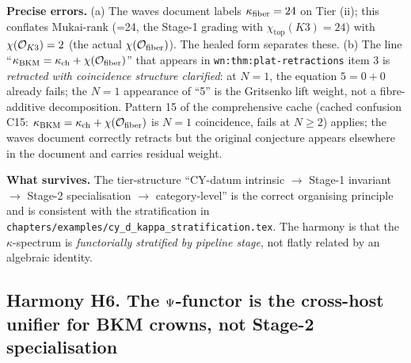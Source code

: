 \textbf{Precise errors.} (a) The waves document labels $\kappa_{\mathrm{fiber}} = 24$
on Tier (ii); this conflates Mukai-rank (=24, the Stage-1 grading with
$\chi_{\mathrm{top}}(K3) = 24$) with $\chi(\mathcal{O}_{K3}) = 2$ (the actual
$\chi(\mathcal{O}_\mathrm{fiber})$). The healed form separates these. (b) The
line ``$\kappa_{\mathrm{BKM}} = \kappa_{\mathrm{ch}} + \chi(\mathcal{O}_\mathrm{fiber})$'' that appears in
\verb|wn:thm:plat-retractions| item 3 is
\emph{retracted with coincidence structure clarified}: at $N = 1$,
the equation $5 = 0 + 0$ already fails; the $N = 1$ appearance of
``5'' is the Gritsenko lift weight, not a fibre-additive decomposition.
Pattern 15 of the comprehensive cache (cached confusion C15:
$\kappa_{\mathrm{BKM}} = \kappa_{\mathrm{ch}} + \chi(\mathcal{O}_\mathrm{fiber})$ is $N = 1$ coincidence,
fails at $N \ge 2$) applies; the waves document correctly retracts but
the original conjecture appears elsewhere in the document and carries
residual weight.

\textbf{What survives.} The tier-structure ``CY-datum intrinsic
$\to$ Stage-1 invariant $\to$ Stage-2 specialisation $\to$ category-level''
is the correct organising principle and is consistent with the
stratification in \verb|chapters/examples/cy_d_kappa_stratification.tex|.
The harmony is that the $\kappa$-spectrum is \emph{functorially
stratified by pipeline stage}, not flatly related by an algebraic
identity.

\subsection{Harmony H6. The $\Psi$-functor is the cross-host
unifier for BKM crowns, not Stage-2 specialisation}
\label{wn:subsec:H6-Psi-functor}


